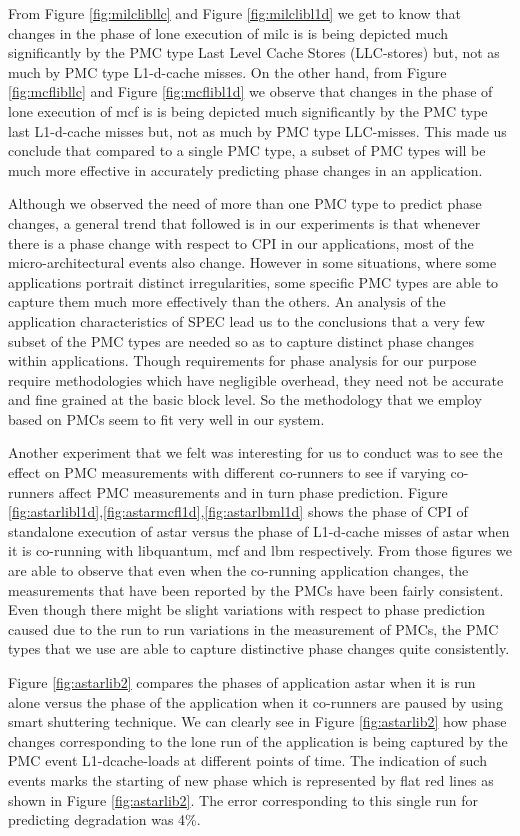\documentclass[pageno]{jpaper}
\begin{document}
From Figure \ref{fig:milclibllc} and Figure \ref{fig:milclibl1d} we get to know that changes in the phase of lone execution of milc is is being depicted much significantly by the PMC type Last Level Cache Stores (LLC-stores) but, not as much by PMC type L1-d-cache misses. On the other hand, from Figure \ref{fig:mcflibllc} and Figure \ref{fig:mcflibl1d} we observe that changes in the phase of lone execution of mcf is is being depicted much significantly by the PMC type last L1-d-cache misses but, not as much by PMC type LLC-misses. This made us conclude that compared to a single PMC type, a subset of PMC types will be much more effective in accurately predicting phase changes in an application.

Although we observed the need of more than one PMC type to predict phase changes, a general trend that followed is in our experiments is that whenever there is a phase change with respect to CPI in our applications, most of the micro-architectural events also change. However in some situations, where some applications portrait distinct irregularities, some specific PMC types are able to capture them much more effectively than the others. An analysis of the application characteristics of SPEC lead us to the conclusions that a very few subset of the PMC types are needed so as to capture distinct phase changes within applications. Though requirements for phase analysis for our purpose require methodologies which have negligible overhead, they need not be accurate and fine grained at the basic block level. So the methodology that we employ based on PMCs seem to fit very well in our system.

Another experiment that we felt was interesting for us to conduct was to see the effect on PMC measurements with different co-runners to see if varying co-runners affect PMC measurements and in turn phase prediction. Figure \ref{fig:astarlibl1d},\ref{fig:astarmcfl1d},\ref{fig:astarlbml1d} shows the phase of CPI of standalone execution of astar versus the phase of L1-d-cache misses of astar when it is co-running with libquantum, mcf and lbm respectively. From those figures we are able to observe that even when the co-running application changes, the measurements that have been reported by the PMCs have been fairly consistent. Even though there might be slight variations with respect to phase prediction caused due to the run to run variations in the measurement of PMCs, the PMC types that we use are able to capture distinctive phase changes quite consistently.

Figure \ref{fig:astarlib2} compares the phases of application astar when it is run alone versus the phase of the application when it co-runners are paused by using smart shuttering technique. We can clearly see in Figure \ref{fig:astarlib2} how phase changes corresponding to the lone run of the application is being captured by the PMC event L1-dcache-loads at different points of time. The indication of such events marks the starting of new phase which is represented by flat red lines as shown in Figure \ref{fig:astarlib2}. The error corresponding to this single run for predicting degradation was 4\%.
\end{document}
